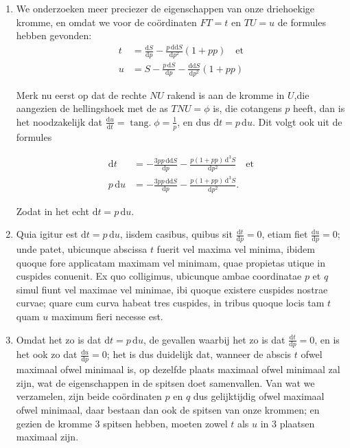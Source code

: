 \documentclass[10pt,a4paper]{article}
\newcommand{\switchenum}{\setcounter{enumi}{\arabic{enumi}-1}\switchcolumn}
\DeclareMathOperator{\tang}{tang.}
\def\D{\mathrm{d}}
\begin{document}
\begin{paracol}{2}
\begin{enumerate}[topsep=1px]
		\switchenum
		\item We onderzoeken meer preciezer de eigenschappen van onze driehoekige kromme, en omdat we voor de coördinaten $FT=t$ en $TU=u$ de formules hebben gevonden:
		\begin{align*}
			t & = \frac{\D S}{\D p}-\frac{p\,\D \D S}{\D p^2}(1+pp)\quad\text{et}\\
			u & = S-\frac{p\,\D S}{\D p}-\frac{\D\D S}{\D p^2}(1+pp)
		\end{align*}
		\par Merk nu eerst op dat de rechte $NU$ rakend is aan de kromme in $U$,die aangezien de hellingshoek met de as $TNU=\phi$ is, die cotangens $p$ heeft, dan is het noodzakelijk dat $\frac{\D u}{\D t} = \tang \phi = \frac{1}{p}$, en dus $\D t = p \, \D u$. Dit volgt ook uit de formules 

		\begin{align*}
			\D t &= -\frac{3pp\, \D\D S}{\D p}-\frac{p(1+pp)\, \D^3S}{\D p^2} \quad \text{et}\\
			p\, \D u &= - \frac{3pp \, \D \D S}{\D p} - \frac{p(1+pp)\, \D^3S}{\D p^2}.
		\end{align*}
		\par Zodat in het echt $\D t=p\, \D u$.
		
		\switchcolumn*
		
		\item Quia igitur est $\D t=p \,\D u$, iisdem casibus, quibus sit $\frac{\D t}{\D p}=0$, etiam fiet $\frac{\D u}{\D p}= 0$; unde patet, ubicunque abscissa $t$ fuerit vel maxima vel minima, ibidem quoque fore applicatam maximam vel minimam, quae propietas utique in cuspides conuenit. Ex quo colligimus, ubicunque ambae coordinatae $p$ et $q$ simul fiunt vel maximae vel minimae, ibi quoque existere cuspides nostrae curvae; quare cum curva habeat tres cuspides, in tribus quoque locis tam $t$ quam $u$ maximum fieri necesse est.
		
		\switchenum
		\item Omdat het zo is dat $\D t=p\, \D u$, de gevallen waarbij het zo is dat $\frac{\D t}{\D p}=0$, en is het ook zo dat $\frac{\D u}{\D p}= 0$; het is dus duidelijk dat, wanneer de abscis $t$ ofwel maximaal ofwel minimaal is, op dezelfde plaats maximaal ofwel minimaal zal zijn, wat de eigenschappen in de spitsen doet samenvallen. Van wat we verzamelen, zijn beide coördinaten $p$ en $q$ dus gelijktijdig ofwel maximaal ofwel minimaal, daar bestaan dan ook de spitsen van onze krommen; en gezien de kromme 3 spitsen hebben, moeten zowel $t$ als $u$ in 3 plaatsen maximaal zijn.
		

\end{enumerate}
\end{paracol}
\end{document}
